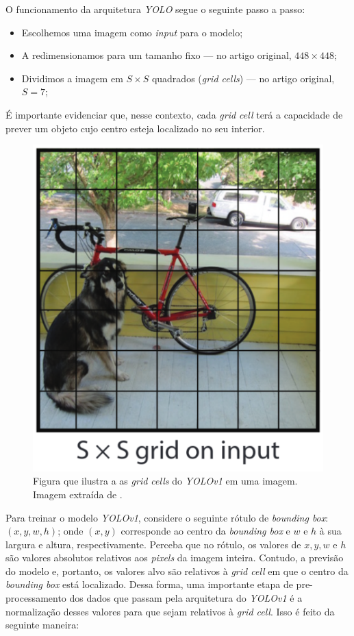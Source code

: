 O funcionamento da arquitetura \emph{YOLO} segue o seguinte passo a passo:

\begin{itemize}
    \item Escolhemos uma imagem como \emph{input} para o modelo;
    \item A redimensionamos para um tamanho fixo --- no artigo original, $448 \times 448$;
    \item Dividimos a imagem em $S \times S$ quadrados (\emph{grid cells}) --- no artigo original, $S = 7$;
\end{itemize}

É importante evidenciar que, nesse contexto, cada \emph{grid cell} terá a capacidade de prever um objeto cujo centro esteja localizado no seu interior.

\begin{figure}
    \centering
    \includegraphics[width=0.5\linewidth]{images/grid_cells.png}
    \caption{\label{fig:grid_cells} Figura que ilustra a as \emph{grid cells} do \emph{YOLOv1} em uma imagem. Imagem extraída de \cite{yolo}.}
\end{figure}

Para treinar o modelo \emph{YOLOv1}, considere o seguinte rótulo de \emph{bounding box}:$(x, y, w, h)$; onde $(x,y)$ corresponde ao centro da \emph{bounding box} e $w$ e $h$ à sua largura e altura, respectivamente. Perceba que no rótulo, os valores de $x, y, w$ e $h$ são valores absolutos relativos aos \emph{pixels} da imagem inteira. Contudo, a previsão do modelo e, portanto, os valores alvo são relativos à \emph{grid cell} em que o centro da \emph{bounding box} está localizado. Dessa forma, uma importante etapa de pre-processamento dos dados que passam pela arquitetura do \emph{YOLOv1} é a normalização desses valores para que sejam relativos à \emph{grid cell}. Isso é feito da seguinte maneira:

